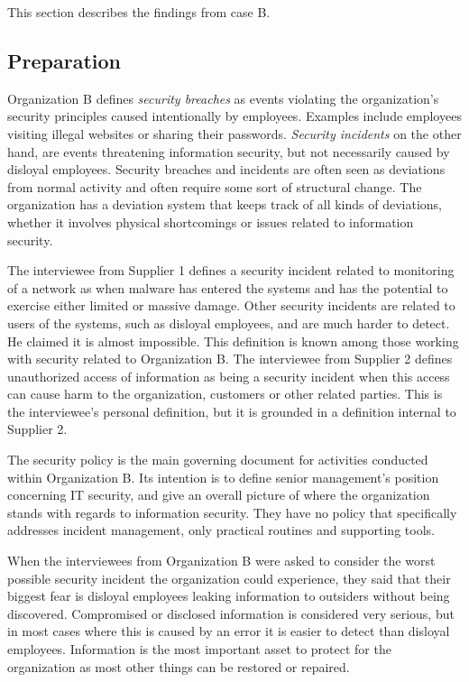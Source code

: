 This section describes the findings from case B.

\subsection{Preparation}
Organization B defines \textit{security breaches} as events violating the organization's security principles caused intentionally by employees. Examples include employees visiting illegal websites or sharing their passwords. \textit{Security incidents} on the other hand, are events threatening information security, but not necessarily caused by disloyal employees. Security breaches and incidents are often seen as deviations from normal activity and often require some sort of structural change. The organization has a deviation system that keeps track of all kinds of deviations, whether it involves physical shortcomings or issues related to information security.

The interviewee from Supplier 1 defines a security incident related to monitoring of a network as when malware has entered the systems and has the potential to exercise either limited or massive damage. Other security incidents are related to users of the systems, such as disloyal employees, and are much harder to detect. He claimed it is almost impossible. This definition is known among those working with security related to Organization B. The interviewee from Supplier 2 defines unauthorized access of information as being a security incident when this access can cause harm to the organization, customers or other related parties. This is the interviewee's personal definition, but it is grounded in a definition internal to Supplier 2.

The security policy is the main governing document for activities conducted within Organization B. Its intention is to define senior management's position concerning IT security, and give an overall picture of where the organization stands with regards to information security. They have no policy that specifically addresses incident management, only practical routines and supporting tools.

When the interviewees from Organization B were asked to consider the worst possible security incident the organization could experience, they said that their biggest fear is disloyal employees leaking information to outsiders without being discovered. Compromised or disclosed information is considered very serious, but in most cases where this is caused by an error it is easier to detect than disloyal employees. Information is the most important asset to protect for the organization as most other things can be restored or repaired.

